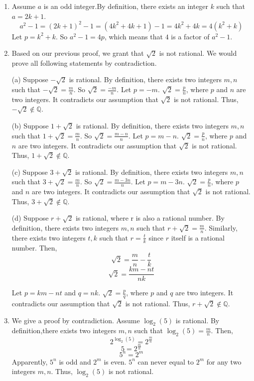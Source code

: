 \documentclass[a4paper]{article}
\begin{document}
\begin{enumerate}

\item[18]
Assume $a$ is an odd integer.By definition, there exists an integer $k$ such that $a=2k+1$. 
$$a^2-1=(2k+1)^2-1=(4k^2+4k+1)-1=4k^2+4k=4(k^2+k)$$
Let $p=k^2+k$. So $a^2-1=4p$, which means that $4$ is a factor of $a^2-1$.


\item[6]
Based on our previous proof, we grant that $\sqrt{2}$ is not rational.
We would prove all following statements  by contradiction.


(a) Suppose $-\sqrt{2}$ is rational. By definition, there exists two integers $m,n$ such that $-\sqrt{2}=\frac{m}{n}$. So $\sqrt{2}=\frac{-m}{n}$. Let $p=-m$. $\sqrt{2}=\frac{p}{n}$, where $p$ and $n$ are two integers. It contradicts our assumption that $\sqrt{2}$ is not rational. Thus, $-\sqrt{2} \notin \mathbb{Q}$.

(b) Suppose $1+\sqrt{2}$ is rational. By definition, there exists two integers $m,n$ such that $1+\sqrt{2}=\frac{m}{n}$. So $\sqrt{2}=\frac{m-n}{n}$. Let $p=m-n$. $\sqrt{2}=\frac{p}{n}$, where $p$ and $n$ are two integers. It contradicts our assumption that $\sqrt{2}$ is not rational. Thus, $1+\sqrt{2} \notin \mathbb{Q}$.

(c) Suppose $3+\sqrt{2}$ is rational. By definition, there exists two integers $m,n$ such that $3+\sqrt{2}=\frac{m}{n}$. So $\sqrt{2}=\frac{m-3n}{n}$. Let $p=m-3n$. $\sqrt{2}=\frac{p}{n}$, where $p$ and $n$ are two integers. It contradicts our assumption that $\sqrt{2}$ is not rational. Thus, $3+\sqrt{2} \notin \mathbb{Q}$.

(d) Suppose $r+\sqrt{2}$ is rational, where r is also a rational number. By definition, there exists two integers $m,n$ such that $r+\sqrt{2}=\frac{m}{n}$. Similarly, there exists two integers $t,k$ such that $r=\frac{t}{k}$ since $r$ itself is a rational number. Then,
$$\sqrt{2}=\frac{m}{n}-\frac{t}{k}$$
$$\sqrt{2}=\frac{km-nt}{nk}$$

Let $p=km-nt$ and $q=nk$. $\sqrt{2}=\frac{p}{q}$, where $p$ and $q$ are two integers. It contradicts our assumption that $\sqrt{2}$ is not rational. Thus, $r+\sqrt{2} \notin \mathbb{Q}$.



\item[8]
We give a proof by contradiction. 
Assume $\log_{2}(5)$ is rational. By definition,there exists two integers $m,n$ such that $\log_{2}(5)=\frac{m}{n}$. Then,
 $$2^{\log_{2}(5)}=2^{\frac{m}{n}}$$
 $$5=2^{\frac{m}{n}}$$
$$5^{n}=2^{m}$$
Apparently, $5^{n}$ is odd and $2^{m}$ is even. $5^{n}$ can never equal to $2^{m}$ for any two integers $m,n$. 
Thus,  $\log_{2}(5)$ is not rational.






\end{enumerate}
\end{document}
